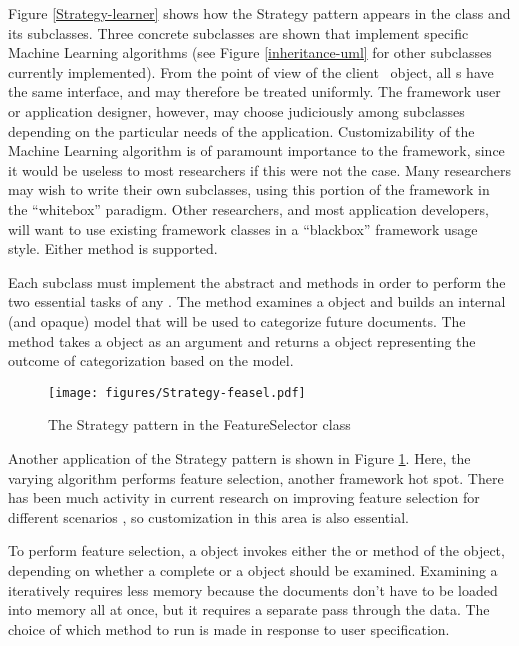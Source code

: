 Figure \ref{Strategy-learner} shows how the Strategy pattern appears
in the  class and its subclasses.  Three concrete
subclasses are shown that implement specific Machine Learning
algorithms (see Figure \ref{inheritance-uml} for other 
subclasses currently implemented).  From the point of view of the
client \aicat\ object, all s have the same interface,
and may therefore be treated uniformly.  The framework user or
application designer, however, may choose judiciously among subclasses
depending on the particular needs of the application.  Customizability
of the Machine Learning algorithm is of paramount importance to the
framework, since it would be useless to most researchers if this were
not the case.  Many researchers may wish to write their own
 subclasses, using this portion of the framework in the
``whitebox'' paradigm.  Other researchers, and most application
developers, will want to use existing framework classes in a
``blackbox'' framework usage style. \cite[p. 10]{fayad:99} Either
method is supported.

Each  subclass must implement the abstract
 and  methods in order to perform the
two essential tasks of any .  The  method
examines a  object and builds an internal (and
opaque) model that will be used to categorize future documents.  The
 method takes a  object as an
argument and returns a  object representing the
outcome of categorization based on the model.

\begin{figure}
\texttt{[image: figures/Strategy-feasel.pdf]}
\caption{The Strategy pattern in the FeatureSelector class}
\label{Strategy-feasel}
\end{figure}

Another application of the Strategy pattern is shown in Figure
\ref{Strategy-feasel}.  Here, the varying algorithm performs
feature selection, another framework hot spot.  There has been much
activity in current research on improving feature selection for
different scenarios \cite{yang:01,yang:97}, so customization in this
area is also essential.

To perform feature selection, a  object invokes
either the  or  method
of the  object, depending on whether a complete
 or a  object should be
examined.  Examining a  iteratively requires less
memory because the documents don't have to be loaded into memory all
at once, but it requires a separate pass through the data.  The choice
of which method to run is made in response to user specification.

